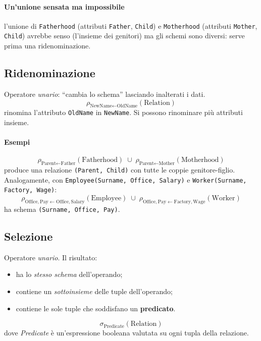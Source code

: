\documentclass[a4paper,12pt]{article}
\begin{document}
\paragraph{Un'unione sensata ma impossibile} l'unione di \texttt{Fatherhood}
(attributi \texttt{Father}, \texttt{Child}) e \texttt{Motherhood} (attributi
\texttt{Mother}, \texttt{Child}) avrebbe senso (l'insieme dei genitori) ma gli
schemi sono diversi: serve prima una ridenominazione.

\subsection{Ridenominazione}

Operatore \emph{unario}: ``cambia lo schema'' lasciando inalterati i dati.
\[
  \rho_{\text{NewName} \leftarrow \text{OldName}}(\text{Relation})
\]
rinomina l'attributo \texttt{OldName} in \texttt{NewName}. Si possono
rinominare più attributi insieme.

\paragraph{Esempi}
\[
  \rho_{\text{Parent} \leftarrow \text{Father}}(\text{Fatherhood}) \;\cup\;
  \rho_{\text{Parent} \leftarrow \text{Mother}}(\text{Motherhood})
\]
produce una relazione \texttt{(Parent, Child)} con tutte le coppie
genitore-figlio. Analogamente, con \texttt{Employee(Surname, Office, Salary)} e
\texttt{Worker(Surname, Factory, Wage)}:
\[
  \rho_{\text{Office},\text{Pay} \leftarrow \text{Office},\text{Salary}}
    (\text{Employee}) \;\cup\;
  \rho_{\text{Office},\text{Pay} \leftarrow \text{Factory},\text{Wage}}
    (\text{Worker})
\]
ha schema \texttt{(Surname, Office, Pay)}.

\subsection{Selezione}

Operatore \emph{unario}. Il risultato:
\begin{itemize}
  \item ha lo \emph{stesso schema} dell'operando;
  \item contiene un \emph{sottoinsieme} delle tuple dell'operando;
  \item contiene le sole tuple che soddisfano un \textbf{predicato}.
\end{itemize}
\[
  \sigma_{\text{Predicate}}(\text{Relation})
\]
dove \emph{Predicate} è un'espressione booleana valutata su ogni tupla della
relazione.
\end{document}
